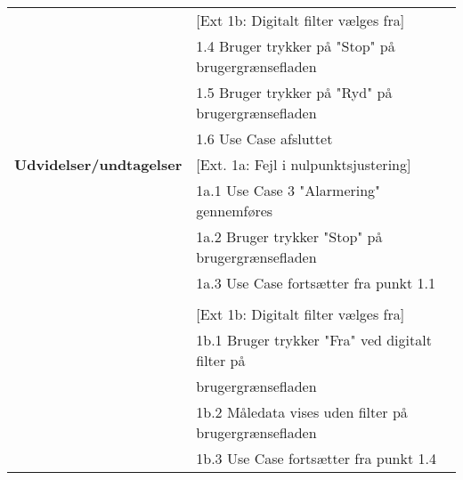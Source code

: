 \begin{table}[h!]
\begin{tabular}{l|l}
		& {[}Ext 1b: Digitalt filter vælges fra{]} \\
		& 1.4 Bruger trykker på "Stop" på brugergrænsefladen \\
		& 1.5 Bruger trykker på "Ryd" på brugergrænsefladen \\
		& 1.6 Use Case afsluttet \\ \hline
		\rowcolor[HTML]{A9D9F9} 
		\textbf{Udvidelser/undtagelser} & {[}Ext. 1a: Fejl i nulpunktsjustering{]} \\
		\rowcolor[HTML]{A9D9F9} 
		& 1a.1 Use Case 3 "Alarmering" gennemføres \\
		\rowcolor[HTML]{A9D9F9} 
		& 1a.2 Bruger trykker "Stop" på brugergrænsefladen \\
		\rowcolor[HTML]{A9D9F9} 
		& 1a.3 Use Case fortsætter fra punkt 1.1 \\
		\rowcolor[HTML]{A9D9F9} 
		&  \\
		\rowcolor[HTML]{A9D9F9} 
		& {[}Ext 1b: Digitalt filter vælges fra{]} \\
		\rowcolor[HTML]{A9D9F9} 
		& 1b.1 Bruger trykker "Fra" ved digitalt filter på \\
		\rowcolor[HTML]{A9D9F9} 
		& brugergrænsefladen \\
		\rowcolor[HTML]{A9D9F9} 
		& 1b.2 Måledata vises uden filter på brugergrænsefladen \\
		\rowcolor[HTML]{A9D9F9} 
		& 1b.3 Use Case fortsætter fra punkt 1.4
	\end{tabular}
\end{table}